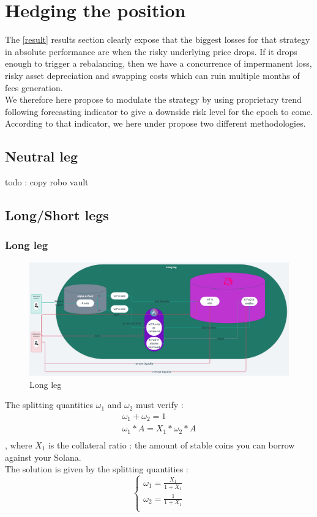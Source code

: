 \documentclass[conference]{IEEEtran}
\begin{document}
\section{Hedging the position}
The \ref{result} results section clearly expose that the biggest losses for that strategy in absolute performance are when the risky underlying price drops. If it drops enough to trigger a rebalancing, then we have a concurrence of impermanent loss, risky asset depreciation and swapping costs which can ruin multiple months of fees generation.\\
We therefore here propose to modulate the strategy by using proprietary trend following forecasting indicator to give a downside risk level for the epoch to come.\\
According to that indicator, we here under propose two different methodologies.

\subsection{Neutral leg}
todo : copy robo vault
\subsection{Long/Short legs}
\subsubsection{Long leg}
\begin{figure}[h!]
    \centering
    \includegraphics[scale=0.035]{Plots/long_leg.png}
    \caption{Long leg}
    \label{fig:conc_liquidity}
\end{figure}
The splitting quantities $\omega_1$ and $\omega_2$ must verify : 
\begin{equation}
\begin{array}{ll}
\omega_1 + \omega_2 = 1\\
\omega_1 * A = X_1*\omega_2 * A\\    
\end{array}
\end{equation}
, where $X_1$ is the collateral ratio : the amount of stable coins you can borrow against your Solana.\\
The solution is given by the splitting quantities :
\begin{equation}
\left\{
\begin{array}{ll}
\omega_1  = \frac{X_1}{1+X_1}\\
\omega_2  = \frac{1}{1+X_1}\\
\end{array}\right.
\end{equation}
\end{document}

